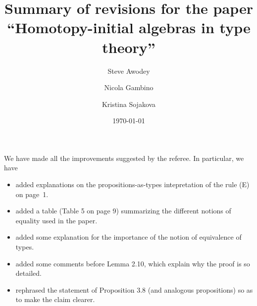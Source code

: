 \documentclass[11pt, oneside]{article}   	%
\title{Summary of revisions for the paper \\  ``Homotopy-initial algebras in type theory''}
\author{Steve Awodey \and Nicola Gambino \and Kristina Sojakova}
\date{\today}							%
\begin{document}
\maketitle

We have made all the improvements suggested by the referee. In particular, we have

\begin{itemize}
\item added explanations on the propositions-as-types intepretation of the rule (E) on page~1.
\item added a table (Table 5 on page 9) summarizing the different notions of equality used in the paper.
\item added some explanation for the importance of the notion of equivalence of types.
\item added some comments before Lemma 2.10, which explain why the proof is so detailed.
\item rephrased the statement of Proposition 3.8  (and analogous propositions) so as to make the claim clearer.
\end{itemize} 
\end{document}
